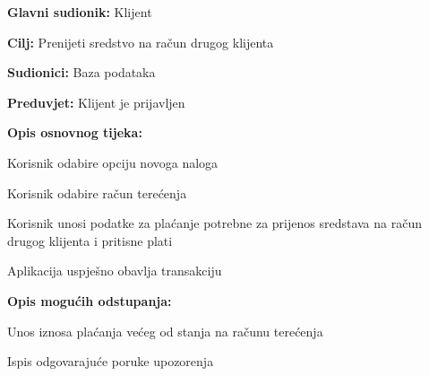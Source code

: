 			
				\noindent {}
			\begin{packed_item}
				
				\item \textbf{Glavni sudionik: }Klijent
				\item  \textbf{Cilj:} Prenijeti sredstvo na račun drugog klijenta
				\item  \textbf{Sudionici:} Baza podataka
				\item  \textbf{Preduvjet:} Klijent je prijavljen
				\item  \textbf{Opis osnovnog tijeka:}
				
				\item[] \begin{packed_enum}
					
					\item Korisnik odabire opciju novoga naloga
					\item Korisnik odabire račun terećenja 
					\item Korisnik unosi podatke za plaćanje potrebne za prijenos sredstava na račun drugog klijenta i pritisne plati
					\item Aplikacija uspješno obavlja transakciju 
					
				\end{packed_enum}
					
					\item  \textbf{Opis mogućih odstupanja:}
					
					\item[] \begin{packed_item}
						
						\item[3.a] Unos iznosa plaćanja većeg od stanja na računu terećenja
						\item[] \begin{packed_enum}
							
							\item Ispis odgovarajuće poruke upozorenja
							
							
						\end{packed_enum}
						
						
					\end{packed_item}
					
				
				
			\end{packed_item}
		
		
			
